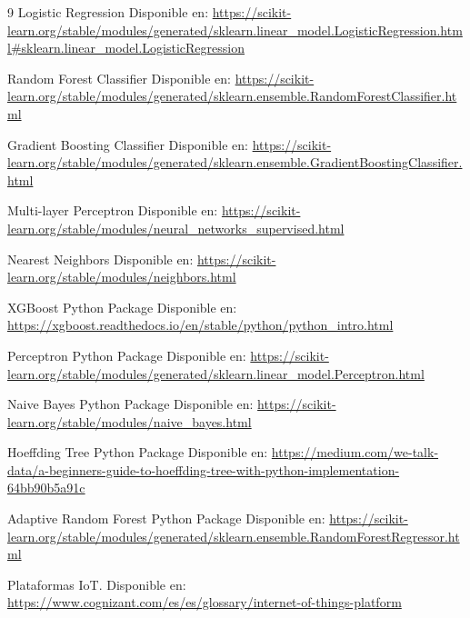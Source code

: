 \documentclass[12pt,a4paper]{report}
\begin{document}
\begin{thebibliography}{9}
Logistic Regression
Disponible en: \url{https://scikit-learn.org/stable/modules/generated/sklearn.linear_model.LogisticRegression.html#sklearn.linear_model.LogisticRegression}

Random Forest Classifier
Disponible en: \url{https://scikit-learn.org/stable/modules/generated/sklearn.ensemble.RandomForestClassifier.html}

Gradient Boosting Classifier
Disponible en: \url{https://scikit-learn.org/stable/modules/generated/sklearn.ensemble.GradientBoostingClassifier.html}

Multi-layer Perceptron
Disponible en: \url{https://scikit-learn.org/stable/modules/neural_networks_supervised.html}

Nearest Neighbors
Disponible en: \url{https://scikit-learn.org/stable/modules/neighbors.html}

XGBoost Python Package
Disponible en: \url{https://xgboost.readthedocs.io/en/stable/python/python_intro.html}

Perceptron Python Package
Disponible en: \url{https://scikit-learn.org/stable/modules/generated/sklearn.linear_model.Perceptron.html}

Naive Bayes Python Package
Disponible en: \url{https://scikit-learn.org/stable/modules/naive_bayes.html}

Hoeffding Tree Python Package
Disponible en: \url{https://medium.com/we-talk-data/a-beginners-guide-to-hoeffding-tree-with-python-implementation-64bb90b5a91c}

Adaptive Random Forest Python Package
Disponible en: \url{https://scikit-learn.org/stable/modules/generated/sklearn.ensemble.RandomForestRegressor.html}

Plataformas IoT.
Disponible en: \url{https://www.cognizant.com/es/es/glossary/internet-of-things-platform}



\end{thebibliography}
\end{document}
